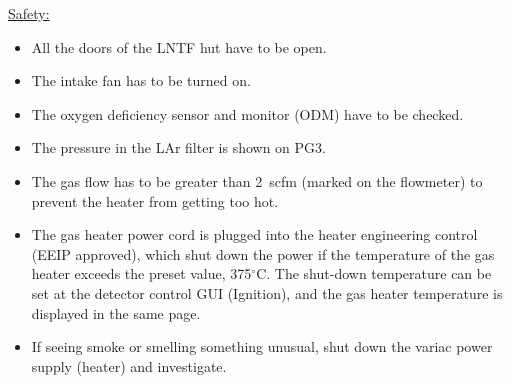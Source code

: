 \documentclass[letterpaper,11pt]{article}
\newcommand{\dC}        {$^\circ$C}
\begin{document}
\underline{Safety:}
\begin{itemize}
\setlength\itemsep{-0.2em}
\item All the doors of the LNTF hut have to be open.
\item The intake fan has to be turned on.
\item The oxygen deficiency sensor and monitor (ODM) have to be checked.
\item The pressure in the LAr filter is shown on PG3.
\item The gas flow has to be greater than 2~scfm (marked on the flowmeter) to prevent the heater from getting too hot.
\item The gas heater power cord is plugged into the heater engineering control (EEIP approved), which shut down the power if the temperature
of the gas heater exceeds the preset value, {\color{orange}375{\dC}}.  
The shut-down temperature can be set at the detector control GUI (Ignition),
and the gas heater temperature is displayed in the same page.
\item If seeing smoke or smelling something unusual, shut down the variac power supply (heater) and investigate.
\end{itemize}
\end{document}
